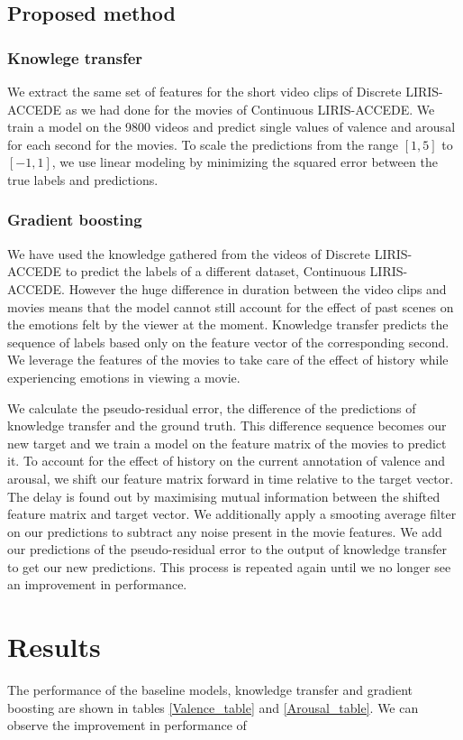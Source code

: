 \documentclass{article}
\begin{document}
\subsection{Proposed method}

\subsubsection{Knowlege transfer}
We extract the same set of features for the short video clips of Discrete LIRIS-ACCEDE as we had done for the movies of Continuous LIRIS-ACCEDE. We train a model on the 9800 videos and predict single values of valence and arousal for each second for the movies. To scale the predictions from the range $[1,5]$ to $[-1,1]$, we use linear modeling by minimizing the squared error between the true labels and predictions. 

\subsubsection{Gradient boosting}
We have used the knowledge gathered from the videos of Discrete LIRIS-ACCEDE to predict the labels of a different dataset, Continuous LIRIS-ACCEDE. However the huge difference in duration between the video clips and movies means that the model cannot still account for the effect of past scenes on the emotions felt by the viewer at the moment. Knowledge transfer predicts the sequence of labels based only on the feature vector of the corresponding second. We leverage the features of the movies to take care of the effect of history while experiencing emotions in viewing a movie.

We calculate the pseudo-residual error, the difference of the predictions of knowledge transfer and the ground truth. This difference sequence becomes our new target and we train a model on the feature matrix of the movies to predict it. To account for the effect of history on the current annotation of valence and arousal, we shift our feature matrix forward in time relative to the target vector. The delay is found out by maximising mutual information between the shifted feature matrix and target vector. We additionally apply a smooting average filter on our predictions to subtract any noise present in the movie features. We add our predictions of the pseudo-residual error to the output of knowledge transfer to get our new predictions. This process is repeated again until we no longer see an improvement in performance.

\section{Results}
The performance of the baseline models, knowledge transfer and gradient boosting are shown in tables \ref{Valence_table} and \ref{Arousal_table}. We can observe the improvement in performance of 
\end{document}
